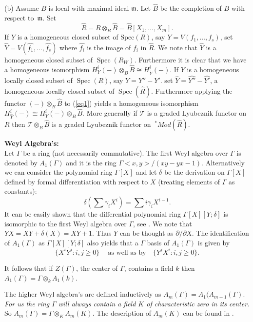 \documentclass{amsart}
\newcommand{\wrt}{with respect to}
\newcommand{\m}{\mathfrak{m} }
\newcommand{\FF}{\mathcal{T}}
\newcommand{\Spec}{\operatorname{Spec}}
\theoremstyle{plain}
\theoremstyle{definition}
\theoremstyle{remark}
\begin{document}
(b) Assume $B$ is local with maximal ideal $\m$. Let $\widehat{B}$ be the completion of $B$ \wrt \ $\m$. Set 
$$\widehat{R} = R \otimes_B \widehat{B} = \widehat{B}[X_1,\ldots, X_m].$$
If $Y$ is a 
homogeneous closed subset of $\text{Spec}(R)$, say
$Y= V(f_1, \ldots, f_s)$, set $\widehat{Y} = V(\widehat{f_1}, \ldots, \widehat{f_s})$  where $\widehat{f_i}$ is the image of
$f_i$ in $\widehat{R}$. We note that
$\widehat{Y}$ is a homogeneous closed subset of $\Spec(R_W)$. Furthermore it is clear that we have a homogeneous isomorphism
$H^i_Y(-)\otimes_B \widehat{B} \cong H^i_{\widehat{Y}}(-)$. If $Y$ is a homogeneous locally closed subset of
$\Spec(R)$, say  $Y = Y'' - Y'$. set 
$\widehat{Y} = \widehat{Y''} - \widehat{Y'}$, a homogeneous locally closed subset of $\Spec(\widehat{R})$. Furthermore applying the functor $(-)\otimes_B \widehat{B}$ to (\ref{eq1})
 yields a
homogeneous isomorphism $H^i_{\widehat{Y}}(-) \cong H^i_Y(-)\otimes_B \widehat{B}$. More generally if $\FF$ is a graded Lyubeznik functor
on $R$ then $\FF\otimes_B \widehat{B}$ is a graded Lyubeznik functor on $ \ ^*Mod(\widehat{R})$.


\s \textbf{Weyl Algebra's:} \\
Let $\Gamma$ be a ring (not necessarily commutative). The first Weyl algebra over $\Gamma$ is denoted by 
$A_1(\Gamma)$ and it is 
the ring $\Gamma<x,y>/(xy - yx -1)$.  Alternatively we can consider the polynomial ring $\Gamma[X]$ and let 
$\delta$ be the derivation on $\Gamma[X]$ defined by formal differentiation with respect to $X$ (treating elements of
$\Gamma$ as constants):
\[
 \delta\left(\sum \gamma_i X^i \right)  = \sum i \gamma_i X^{i-1}.
\]
It can be easily shown that the differential polynomial ring $\Gamma[X][Y; \delta]$ is isomorphic to the first Weyl algebra
over $\Gamma$, see \cite[p.\ 12]{Lam}. We note that  $YX = XY + \delta(X) = XY + 1$. Thus $Y$ can be thought as $\partial/\partial X$. The identification
of $A_1(\Gamma)$ as $\Gamma[X][Y; \delta]$ also yields that a $\Gamma$ basis of $A_1(\Gamma)$ is given by
\[
 \{ X^i Y^j \colon i,j \geq 0 \} \ \quad \text{as well as by} \quad \{ Y^jX^i \colon  i,j \geq 0 \}. 
\]

\noindent It follows that if $Z(\Gamma)$, the center of $\Gamma$,
contains a field $k$ then $A_1(\Gamma) = \Gamma \otimes_k A_1(k)$.

The higher Weyl algebra's are defined inductively as $A_m(\Gamma) = A_1(A_{m-1}(\Gamma)$.
\textit{For us the ring $\Gamma$  will always contain a field $K$ of characteristic zero in its center.} So
$A_m(\Gamma) = \Gamma \otimes_K A_m(K)$. The description of $A_m(K)$ can be found in \cite[Chapter 1]{Bjork}.
\end{document}
